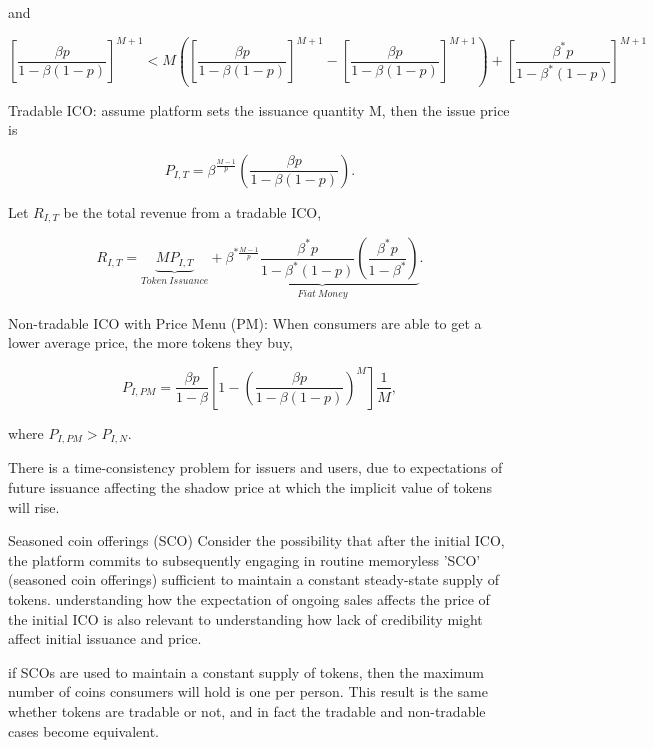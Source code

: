 and

\begin{equation}
    \left[\frac{\beta p}{1-\beta(1-p)}\right]^{M+1}<M\left(\left[\frac{\beta p}{1-\beta(1-p)}\right]^{M+1}-\left[\frac{\beta p}{1-\beta(1-p)}\right]^{M+1}\right)+\left[\frac{\beta^{*}p}{1-\beta^{*}(1-p)}\right]^{M+1}
\end{equation}

Tradable ICO: assume platform sets the issuance quantity M, then the issue price is

\begin{equation}
    P_{I,T}=\beta^{\frac{M-1}{p}}\left(\frac{\beta p}{1-\beta(1-p)}\right).
\end{equation}

Let $R_{I,T}$ be the total revenue from a tradable ICO,

\begin{equation}
    R_{I,T} = \underbrace{M P_{I,T}}_{Token~Issuance}
    +
    \underbrace{\beta^{*\frac{M-1}{p}}\frac{\beta^{*}p}{1-\beta^{*}(1-p)}\left(\frac{\beta^{*}p}{1-\beta^{*}}\right)}_{Fiat~Money}.
\end{equation}

Non-tradable ICO with Price Menu (PM): When consumers are able to get a lower average price, the more tokens they buy,

\begin{equation}
    P_{I,PM} = \frac{\beta p}{1-\beta}[1-\left(\frac{\beta p}{1-\beta(1-p)}\right)^{M}]\frac{1}{M},
\end{equation}

where $P_{I,PM} > P_{I,N}$.

There is a time-consistency problem for issuers and users, due to expectations of future issuance affecting the shadow price at which the implicit value of tokens will rise. 

Seasoned coin offerings (SCO) Consider the possibility that
after the initial ICO, the platform commits to subsequently engaging in routine memoryless 'SCO' (seasoned coin offerings) sufficient to maintain a constant steady-state supply of tokens. understanding how the expectation of ongoing sales affects the price of the initial ICO is also relevant to understanding how lack of credibility might affect initial issuance and price.  

if SCOs are used to maintain a constant supply of tokens, then the maximum number of coins consumers will hold is one per person. This result is the same whether tokens are tradable or not, and in fact the tradable and non-tradable cases become equivalent.

